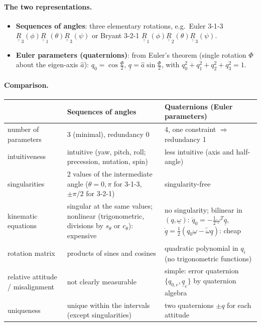 \answer
\paragraph{The two representations.}
\begin{itemize}
\item \textbf{Sequences of angles}: three elementary rotations, e.g.\ Euler 3-1-3 $\underline{\underline R}_3(\phi)\underline{\underline R}_1(\theta)\underline{\underline R}_3(\psi)$ or
Bryant 3-2-1 $\underline{\underline R}_1(\phi)\underline{\underline R}_2(\theta)\underline{\underline R}_3(\psi)$.
\item \textbf{Euler parameters (quaternions)}: from Euler's theorem (single rotation $\Phi$ about the eigen-axis $\hat a$):
$q_0=\cos\frac\Phi2$, $\underline q=\hat a\sin\frac\Phi2$, with $q_0^2+q_1^2+q_2^2+q_3^2=1$.
\end{itemize}

\paragraph{Comparison.}
\begin{center}
\small
\begin{tabular}{@{}p{3.0cm}p{5.8cm}p{5.8cm}@{}}
\toprule
 & Sequences of angles & Quaternions (Euler parameters)\\
\midrule
number of parameters & 3 (minimal), redundancy 0 & 4, one constraint $\Rightarrow$ redundancy 1\\
intuitiveness & intuitive (yaw, pitch, roll; precession, nutation, spin) & less intuitive (axis and half-angle)\\
singularities & 2 values of the intermediate angle ($\theta=0,\pi$ for 3-1-3, $\pm\pi/2$ for 3-2-1) & singularity-free\\
kinematic equations & singular at the same values; nonlinear (trigonometric, divisions by $s_\theta$ or $c_\theta$): expensive & no singularity; bilinear in $(q,\underline\omega)$: $\dot q_0=-\frac12\underline\omega^T\underline q$, $\dot{\underline q}=\frac12(q_0\underline\omega-\tilde\omega\underline q)$: cheap\\
rotation matrix & products of sines and cosines & quadratic polynomial in $q_i$ (no trigonometric functions)\\
relative attitude / misalignment & not clearly measurable & simple: error quaternion $\{q_{0,e},\underline q_e\}$ by quaternion algebra\\
uniqueness & unique within the intervals (except singularities) & two quaternions $\pm q$ for each attitude\\
\bottomrule
\end{tabular}
\end{center}

